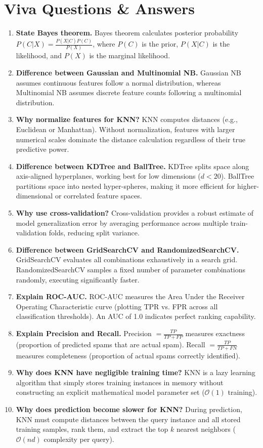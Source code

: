 \documentclass[12pt,a4paper]{article}
\begin{document}
\section{Viva Questions \& Answers}
\begin{enumerate}
    \item \textbf{State Bayes theorem.}
    Bayes theorem calculates posterior probability $P(C|X) = \frac{P(X|C)P(C)}{P(X)}$, where $P(C)$ is the prior, $P(X|C)$ is the likelihood, and $P(X)$ is the marginal likelihood.
    \item \textbf{Difference between Gaussian and Multinomial NB.}
    Gaussian NB assumes continuous features follow a normal distribution, whereas Multinomial NB assumes discrete feature counts following a multinomial distribution.
    \item \textbf{Why normalize features for KNN?}
    KNN computes distances (e.g., Euclidean or Manhattan). Without normalization, features with larger numerical scales dominate the distance calculation regardless of their true predictive power.
    \item \textbf{Difference between KDTree and BallTree.}
    KDTree splits space along axis-aligned hyperplanes, working best for low dimensions ($d < 20$). BallTree partitions space into nested hyper-spheres, making it more efficient for higher-dimensional or correlated feature spaces.
    \item \textbf{Why use cross-validation?}
    Cross-validation provides a robust estimate of model generalization error by averaging performance across multiple train-validation folds, reducing split variance.
    \item \textbf{Difference between GridSearchCV and RandomizedSearchCV.}
    GridSearchCV evaluates all combinations exhaustively in a search grid. RandomizedSearchCV samples a fixed number of parameter combinations randomly, executing significantly faster.
    \item \textbf{Explain ROC-AUC.}
    ROC-AUC measures the Area Under the Receiver Operating Characteristic curve (plotting TPR vs. FPR across all classification thresholds). An AUC of 1.0 indicates perfect ranking capability.
    \item \textbf{Explain Precision and Recall.}
    Precision $= \frac{TP}{TP + FP}$ measures exactness (proportion of predicted spams that are actual spam). Recall $= \frac{TP}{TP + FN}$ measures completeness (proportion of actual spams correctly identified).
    \item \textbf{Why does KNN have negligible training time?}
    KNN is a lazy learning algorithm that simply stores training instances in memory without constructing an explicit mathematical model parameter set ($\mathcal{O}(1)$ training).
    \item \textbf{Why does prediction become slower for KNN?}
    During prediction, KNN must compute distances between the query instance and all stored training samples, rank them, and extract the top $k$ nearest neighbors ($\mathcal{O}(nd)$ complexity per query).
\end{enumerate}
\end{document}
